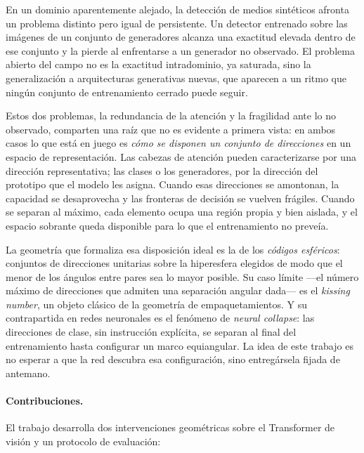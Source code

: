 \documentclass[11pt,a4paper]{article}
\theoremstyle{plain}
\begin{document}
En un dominio aparentemente alejado, la detección de medios sintéticos
afronta un problema distinto pero igual de persistente. Un detector
entrenado sobre las imágenes de un conjunto de generadores alcanza una
exactitud elevada dentro de ese conjunto y la pierde al enfrentarse a un
generador no observado. El problema abierto del campo no es la
exactitud intradominio, ya saturada, sino la generalización a
arquitecturas generativas nuevas, que aparecen a un ritmo que ningún
conjunto de entrenamiento cerrado puede seguir.

Estos dos problemas, la redundancia de la atención y la fragilidad ante
lo no observado, comparten una raíz que no es evidente a primera vista:
en ambos casos lo que está en juego es \emph{cómo se disponen un
conjunto de direcciones} en un espacio de representación. Las cabezas de
atención pueden caracterizarse por una dirección representativa; las
clases o los generadores, por la dirección del prototipo que el modelo
les asigna. Cuando esas direcciones se amontonan, la capacidad se
desaprovecha y las fronteras de decisión se vuelven frágiles. Cuando se
separan al máximo, cada elemento ocupa una región propia y bien aislada,
y el espacio sobrante queda disponible para lo que el entrenamiento no
preveía.

La geometría que formaliza esa disposición ideal es la de los
\emph{códigos esféricos}: conjuntos de direcciones unitarias sobre la
hiperesfera elegidos de modo que el menor de los ángulos entre pares sea
lo mayor posible. Su caso límite ---el número máximo de direcciones que
admiten una separación angular dada--- es el \emph{kissing number},
un objeto clásico de la geometría de empaquetamientos. Y su contrapartida
en redes neuronales es el fenómeno de \emph{neural collapse}: las
direcciones de clase, sin instrucción explícita, se separan al final del
entrenamiento hasta configurar un marco equiangular. La idea de este
trabajo es no esperar a que la red descubra esa configuración, sino
entregársela fijada de antemano.

\paragraph{Contribuciones.} El trabajo desarrolla dos intervenciones
geométricas sobre el Transformer de visión y un protocolo de evaluación:
\end{document}
